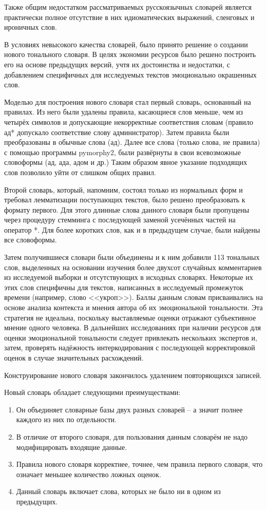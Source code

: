 Также общим недостатком рассматриваемых русскоязычных словарей является практически полное отсутствие в них идиоматических выражений, сленговых и ироничных слов.

В условиях невысокого качества словарей, было принято решение о создании нового тонального словаря. В целях экономии ресурсов было решено построить его на основе предыдущих версий, учтя их достоинства и недостатки, с добавлением специфичных для исследуемых текстов эмоционально окрашенных слов.

Моделью для построения нового словаря стал первый словарь, основанный на правилах. Из него были удалены правила, касающиеся слов меньше, чем из четырёх символов и допускающие некорректные соответствия словам (правило ад* допускало соответствие слову администратор). Затем правила были преобразованы в обычные слова (ад). Далее все слова (только слова, не правила) с помощью программы pymorphy2, были развёрнуты в свои всевозможные словоформы (ад, ада, адом и др.) Таким образом явное указание подходящих слов позволило уйти от слишком общих правил.

Второй словарь, который, напомним, состоял только из нормальных форм и требовал лемматизации поступающих текстов, было решено преобразовать к формату первого. Для этого длинные слова данного словаря были пропущены через процедуру стемминга с последующей заменой усечённых частей на оператор *. Для более коротких слов, как и в предыдущем случае, были найдены все словоформы.

Затем получившиеся словари были объединены и к ним добавили 113 тональных слов, выделенных на основании изучения более двухсот случайных комментариев из исследуемой выборки и отсутствующих в исходных словарях. Некоторые их этих слов специфичны для текстов, написанных в исследуемый промежуток времени (например, слово <<укроп>>). Баллы данным словам присваивались на основе анализа контекста и мнения автора об их эмоциональной тональности. Эта стратегия не идеальна, поскольку выставляемые оценки отражают субъективное мнение одного человека. В дальнейших исследованиях при наличии ресурсов для оценки эмоциональной тональности следует привлекать нескольких экспертов и, затем, проверять надёжность интеркодирования с последующей корректировкой оценок в случае значительных расхождений.

Конструирование нового словаря закончилось удалением повторяющихся записей.

Новый словарь обладает следующими преимуществами:

\begin{enumerate}
\item Он объединяет словарные базы двух разных словарей -- а значит полнее каждого из них по отдельности.
\item В отличие от второго словаря, для пользования данным словарём не надо модифицировать входящие данные.
\item Правила нового словаря корректнее, точнее, чем правила первого словаря, что означает меньшее количество ложных оценок.
\item Данный словарь включает слова, которых не было ни в одном из предыдущих.
\end{enumerate}

